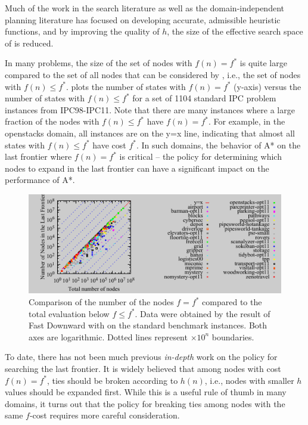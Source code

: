Much of the work in the search literature as well as the domain-independent planning literature has focused on developing accurate, admissible heuristic functions, and 
by improving the quality of $h$, the size of the effective search space of \astar is reduced.


In many problems, the size of the set of nodes with $f(n)=f^*$
is quite large compared to the set of all nodes that can be considered by \astar, i.e., the set of nodes with $f(n) \leq f^*$.
 plots the number of states with $f(n) = f^*$ (y-axis)
versus the number of states with $f(n) \leq f^*$
for a set of 1104 standard IPC problem instances from IPC98-IPC11.
Note that there are many instances where a large fraction of the nodes with $f(n) \leq f^*$ have $f(n)=f^*$.
For example, in the openstacks domain, all instances are on the y=x line, indicating that almost all states with $f(n) \leq f^*$ have cost $f^*$.
In such domains, the behavior of A* on the last frontier where $f(n)=f^*$ is critical -- the policy for determining which nodes to expand in the last frontier can have a significant impact on the performance of A*.

\begin{figure}[htb]
 \centering {}
 \includegraphics{tables/aaai16-frontier/aaai16-lmcut_frontier_noh-front-vs-expanded.pdf}
 \caption{
 Comparison of the number of the nodes $f=f^*$ compared to the
 total evaluation below $f\leq f^*$. Data were obtained by the result of
 Fast Downward with \lmcut on the standard benchmark instances. Both axes are
 logarithmic. Dotted lines represent $\times 10^n$ boundaries.}  \label{fig:plateau-noh}
\end{figure}

To date, there has not been much previous \emph{in-depth} work on the policy for searching the last frontier.
It is widely believed that among nodes with cost $f(n) = f^*$, ties should be broken according to $h(n)$, i.e., nodes with smaller $h$ values should be expanded first.
While this is a useful rule of thumb in many domains,
it turns out that the policy for breaking ties among nodes with the same $f$-cost requires more careful consideration.




